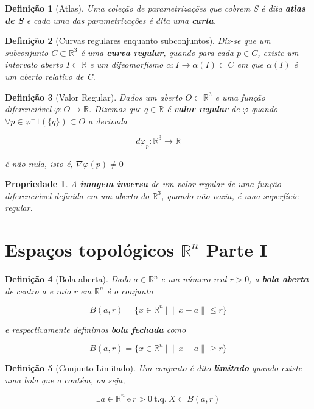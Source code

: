 \documentclass{article}
\newtheorem{prop}{Propriedade}
\newtheorem{definition}{Definição}
\begin{document}
\begin{definition}[Atlas]
Uma coleção de parametrizações que cobrem S é dita \textbf{atlas de S} e cada uma das parametrizações é dita uma \textbf{carta}.
\end{definition}

\begin{definition}[Curvas regulares enquanto subconjuntos]
Diz-se que um subconjunto $C \subset \mathbb{R}^3$ é uma \textbf{curva regular}, quando para cada $p \in C$, existe um intervalo aberto $I \subset \mathbb{R}$ e um difeomorfismo $\alpha: I \rightarrow \alpha(I) \subset C$ em que $\alpha(I)$ é um aberto relativo de C.
\end{definition}

\begin{definition}[Valor Regular]
Dados um aberto $O \subset \mathbb{R}^3$ e uma função diferenciável $\varphi: O \rightarrow \mathbb{R}$. Dizemos que $q \in \mathbb{R}$ é \textbf{valor regular} de $\varphi$ quando $\forall p \in \varphi^-1(\{q\}) \subset O$ a derivada

$$d\varphi_p: \mathbb{R}^3 \rightarrow \mathbb{R}$$

é não nula, isto é, $\nabla \varphi(p) \neq 0$
\end{definition}

\begin{prop}
A \textbf{imagem inversa} de um valor regular de uma função diferenciável definida em um aberto do $\mathbb{R}^3$, quando não vazia, é uma superfície regular.
\end{prop}

\section*{Espaços topológicos $\mathbb{R}^n$ Parte I}
\label{s9}
\begin{definition}[Bola aberta]
Dado $a \in \mathbb{R}^n$ e um número real $r > 0$, a \textbf{bola aberta} de centro a e raio r em $\mathbb{R}^n$ é o conjunto

$$B(a, r) = \{ x \in \mathbb{R}^n\ |\ \| x - a \| \leq r \}$$

e respectivamente definimos \textbf{bola fechada} como

$$B(a, r) = \{ x \in \mathbb{R}^n\ |\ \| x - a \| \geq r \}$$
\end{definition}

\begin{definition}[Conjunto Limitado]
Um conjunto é dito \textbf{limitado} quando existe uma bola que o contém, ou seja,

$$\exists a \in \mathbb{R}^n\ \mathrm{e}\ r>0\ \mathrm{t.q.}\ X \subset B(a, r)$$
\end{definition}
\end{document}
